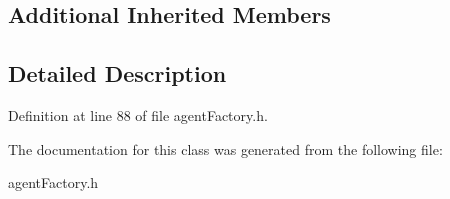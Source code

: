 \subsection*{Additional Inherited Members}


\subsection{Detailed Description}


Definition at line 88 of file agent\+Factory.\+h.



The documentation for this class was generated from the following file\+:\begin{DoxyCompactItemize}
\item 
agent\+Factory.\+h\end{DoxyCompactItemize}
